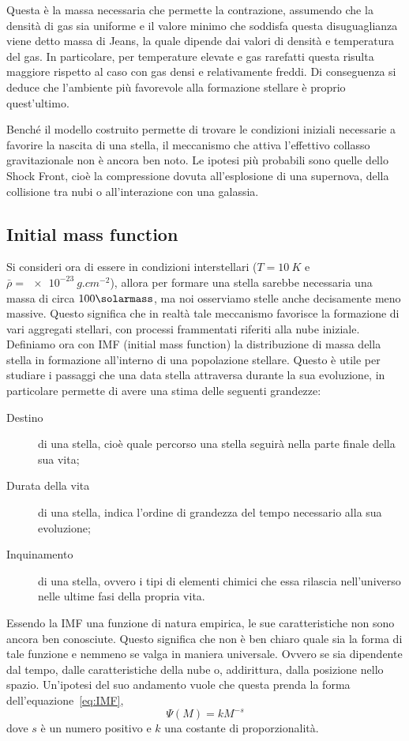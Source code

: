 Questa è la massa necessaria che permette la contrazione, assumendo che la densità di gas sia uniforme e il valore minimo che soddisfa questa disuguaglianza viene detto massa di Jeans, la quale dipende dai valori di densità e temperatura del gas. In particolare, per temperature elevate e gas rarefatti questa risulta maggiore rispetto al caso con gas densi e relativamente freddi. Di conseguenza si deduce che l'ambiente più favorevole alla formazione stellare è proprio quest'ultimo.

Benché il modello costruito permette di trovare le condizioni iniziali necessarie a favorire la nascita di una stella, il meccanismo che attiva l'effettivo collasso gravitazionale non è ancora ben noto. Le ipotesi più probabili sono quelle dello Shock Front, cioè la compressione dovuta all'esplosione di una supernova, della collisione tra nubi o all'interazione con una galassia.
\subsection{Initial mass function}
Si consideri ora di essere in condizioni interstellari ($T = \SI{10}{K}$ e $ \bar \rho = \SI{e-23}{g.cm^{-2}} $), allora per formare una stella sarebbe necessaria una massa di circa $100 \si{\solarmass} $, ma noi osserviamo stelle anche decisamente meno massive. Questo significa che in realtà tale meccanismo favorisce la formazione di vari aggregati stellari, con processi frammentati riferiti alla nube iniziale. Definiamo ora con IMF (initial mass function) la distribuzione di massa della stella in formazione all'interno di una popolazione stellare. Questo è utile per studiare i passaggi che una data stella attraversa durante la sua evoluzione, in particolare permette di avere una stima delle seguenti grandezze:
\begin{description}
    \item[Destino] di una stella, cioè quale percorso una stella seguirà nella parte finale della sua vita;
    \item[Durata della vita] di una stella, indica l'ordine di grandezza del tempo necessario alla sua evoluzione;
    \item[Inquinamento] di una stella, ovvero i tipi di elementi chimici che essa rilascia nell'universo nelle ultime fasi della propria vita.
\end{description}

Essendo la IMF una funzione di natura empirica, le sue caratteristiche non sono ancora ben conosciute. Questo significa che non è ben chiaro quale sia la forma di tale funzione e nemmeno se valga in maniera universale. Ovvero se sia dipendente dal tempo, dalle caratteristiche della nube o, addirittura, dalla posizione nello spazio. Un'ipotesi del suo andamento vuole che questa prenda la forma dell'equazione~\eqref{eq:IMF},
\begin{equation}
    \Psi(M) = k M^{-s}
    \label{eq:IMF}
\end{equation}
dove $s$ è un numero positivo e $k$ una costante di proporzionalità.

